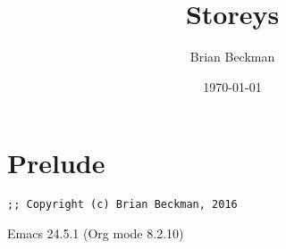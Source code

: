 \documentclass[10pt,oneside,x11names]{article}
\author{Brian Beckman}
\date{\today}
\title{Storeys}
\begin{document}
\maketitle
\setcounter{tocdepth}{2}
\tableofcontents


\section{Prelude}
\label{sec:orgheadline1}

\begin{verbatim}
;; Copyright (c) Brian Beckman, 2016
\end{verbatim}
Emacs 24.5.1 (Org mode 8.2.10)
\end{document}
